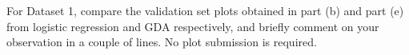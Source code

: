 \item {}
For Dataset 1, compare the validation set plots obtained in part (b) and part (e)
from logistic regression and GDA respectively, and briefly comment on your observation in a couple of lines. No plot submission is required.
